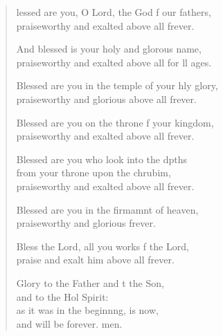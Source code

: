 \settowidth{\versewidth}{Blessed are you in the temple of your holy glory, *}
\begin{verse}%
  \begin{patverse}
lessed are you, O Lord, the God f our fathers,\Med\\
praiseworthy and exalted above all frever.

And blessed is your holy and glor\pointup{\i}ous name,\Med\\
praiseworthy and exalted above all for ll ages.

Blessed are you in the temple of your hly glory,\Med\\
praiseworthy and glorious above all frever.

Blessed are you on the throne f your kingdom,\Med\\
praiseworthy and exalted above all frever.

Blessed are you who look into the dpths\Flex\\
from your throne upon the chrubim,\Med\\
praiseworthy and exalted above all frever.

Blessed are you in the firmamnt of heaven,\Med\\
praiseworthy and glorious frever.

Bless the Lord, all you works f the Lord,\Med\\
praise and exalt him above all frever.

Glory to the Father and t the Son,\Med\\
and to the Hol Spirit:\\
as it was in the beginn\pointup{\i}ng, is now,\Med\\
and will be forever. men. 
  \end{patverse}
\end{verse}
